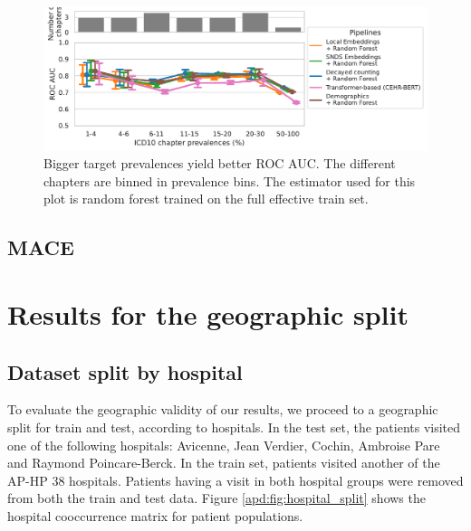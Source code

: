 \documentclass[french,12pt,twoside,a4paper]{book}
\begin{document}
\begin{appendices}
  \begin{figure}[!h]
    \centering
    \includegraphics[width=0.8\linewidth]{img/chapter_3/prognosis/prevalence_results__est_random_forests_boxplot_roc_auc_score_xlog.pdf}
    \caption{ Bigger target prevalences yield better ROC AUC. The
      different chapters are binned in prevalence bins. The estimator used for
      this plot is random forest trained on the full effective train set.}%
    \label{apd:fig:prognosis_prevalences_auroc}
  \end{figure}




  \subsection{MACE}\label{apd:temporal_split:mace}

  \section{Results for the geographic split}\label{apd:hospital_split}

  \subsection{Dataset split by hospital}

  To evaluate the geographic validity of our results, we proceed to a
  geographic split for train and test, according to hospitals. In the test set,
  the patients visited one of the following hospitals: Avicenne, Jean Verdier,
  Cochin, Ambroise Pare and Raymond Poincare-Berck. In the train set, patients
  visited another of the AP-HP 38 hospitals. Patients having a visit in both
  hospital groups were removed from both the train and test data. Figure
  \ref{apd:fig:hospital_split} shows the hospital cooccurrence matrix for
  patient populations.



\end{appendices}
\end{document}
